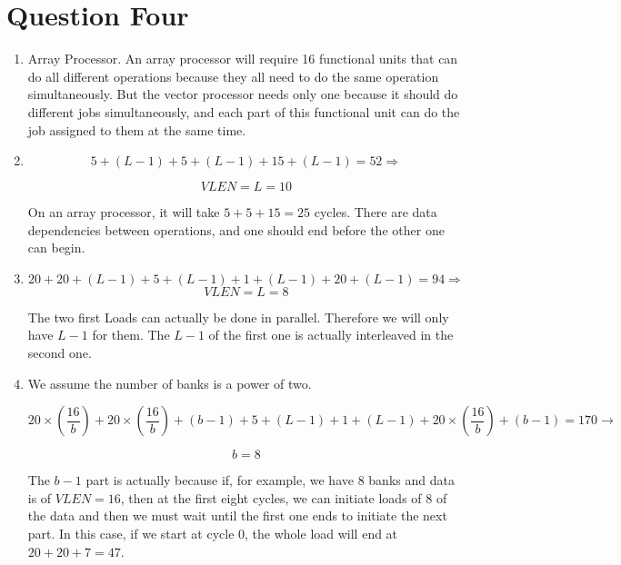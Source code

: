 \documentclass[12pt]{article}
\begin{document}
\section{Question Four}
\begin{enumerate}[label=\alph*.]
	
	\item 
	Array Processor. An array processor will require 16 functional units that can do all different operations because they all need to do the same operation simultaneously. But the vector processor needs only one because it should do different jobs simultaneously, and each part of this functional unit can do the job assigned to them at the same time.
	
	\item 
	
	$$5 + (L-1) + 5 + (L-1) + 15 + (L-1) = 52 \Rightarrow$$ 
	
	$$VLEN = L = 10$$
	
	On an array processor, it will take $5+5+15=25$ cycles. There are data dependencies between operations, and one should end before the other one can begin.
	
	\item 
	$$20 + 20 + (L -1)  + 5 + (L-1) + 1 + (L-1) + 20 + (L-1) = 94 \Rightarrow$$
	$$VLEN = L = 8$$
	
	The two first Loads can actually be done in parallel. Therefore we will only have $L-1$ for them. The $L-1$ of the first one is actually interleaved in the second one.
	
	
	
	\item 
	
	
	We assume the number of banks is a power of two.
	
	$$20 \times (\frac{16}{b}) + 20 \times (\frac{16}{b}) + (b-1) + 5 + (L-1) + 1 + (L-1) + 20 \times (\frac{16}{b}) + (b-1) = 170 \rightarrow$$
	
	$$b=8$$
	
	
	The $b-1$ part is actually because if, for example, we have $8$ banks and data is of $VLEN = 16$, then at the first eight cycles, we can initiate loads of 8 of the data and then we must wait until the first one ends to initiate the next part. In this case, if we start at cycle 0, the whole load will end at $20 + 20 + 7=47$.
	
	
\end{enumerate}


\newpage
\end{document}
